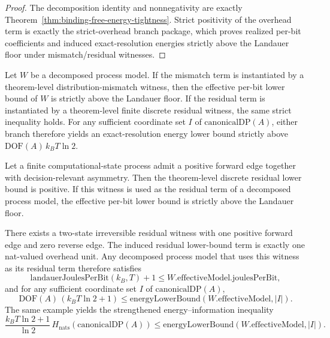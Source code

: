 \begin{proof}
The decomposition identity and nonnegativity are exactly Theorem~\ref{thm:binding-free-energy-tightness}. Strict positivity of the overhead term is exactly the strict-overhead branch package, which proves realized per-bit coefficients and induced exact-resolution energies strictly above the Landauer floor under mismatch/residual witnesses.
\end{proof}

\begin{proposition}\label{prop:strict-overhead}
Let $W$ be a decomposed process model. If the mismatch term is instantiated by a theorem-level distribution-mismatch witness, then the effective per-bit lower bound of $W$ is strictly above the Landauer floor. If the residual term is instantiated by a theorem-level finite discrete residual witness, the same strict inequality holds. For any sufficient coordinate set $I$ of $\mathrm{canonicalDP}(A)$, either branch therefore yields an exact-resolution energy lower bound strictly above $\mathrm{DOF}(A)\,k_B T \ln 2$.
\end{proposition}

\begin{proposition}\label{prop:finite-discrete-residual}
Let a finite computational-state process admit a positive forward edge together with decision-relevant asymmetry. Then the theorem-level discrete residual lower bound is positive. If this witness is used as the residual term of a decomposed process model, the effective per-bit lower bound is strictly above the Landauer floor.
\end{proposition}

\begin{proposition}\label{prop:binary-residual-example}
There exists a two-state irreversible residual witness with one positive forward edge and zero reverse edge. The induced residual lower-bound term is exactly one nat-valued overhead unit. Any decomposed process model that uses this witness as its residual term therefore satisfies
\[
\mathrm{landauerJoulesPerBit}(k_B,T) + 1
\le
W.\mathrm{effectiveModel}.\mathrm{joulesPerBit},
\]
and for any sufficient coordinate set $I$ of $\mathrm{canonicalDP}(A)$,
\[
\mathrm{DOF}(A)\,(k_B T \ln 2 + 1)
\le
\mathrm{energyLowerBound}(W.\mathrm{effectiveModel},|I|).
\]
The same example yields the strengthened energy--information inequality
\[
\frac{k_B T \ln 2 + 1}{\ln 2}
\, H_{\mathrm{nats}}(\mathrm{canonicalDP}(A))
\le
\mathrm{energyLowerBound}(W.\mathrm{effectiveModel},|I|).
\]
\end{proposition}

